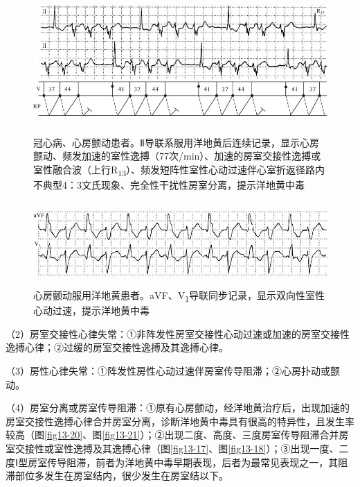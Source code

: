 \begin{figure}[!htbp]
 \centering
 \includegraphics[width=5.71875in,height=2.15625in]{./images/Image00736.jpg}
 \captionsetup{justification=centering}
 \caption{冠心病、心房颤动患者。Ⅱ导联系服用洋地黄后连续记录，显示心房颤动、频发加速的室性逸搏（77次/min）、加速的房室交接性逸搏或室性融合波（上行R\textsubscript{13}）、频发短阵性室性心动过速伴心室折返径路内不典型4：3文氏现象、完全性干扰性房室分离，提示洋地黄中毒}
 \label{fig46-1}
  \end{figure} 


\begin{figure}[!htbp]
 \centering
 \includegraphics[width=5.6875in,height=1.26042in]{./images/Image00737.jpg}
 \captionsetup{justification=centering}
 \caption{心房颤动服用洋地黄患者。aVF、V\textsubscript{1}导联同步记录，显示双向性室性心动过速，提示洋地黄中毒}
 \label{fig46-2}
  \end{figure} 


（2）房室交接性心律失常：①非阵发性房室交接性心动过速或加速的房室交接性逸搏心律；②过缓的房室交接性逸搏及其逸搏心律。

（3）房性心律失常：①阵发性房性心动过速伴房室传导阻滞；②心房扑动或颤动。

（4）房室分离或房室传导阻滞：①原有心房颤动，经洋地黄治疗后，出现加速的房室交接性逸搏心律合并房室分离，诊断洋地黄中毒具有很高的特异性，且发生率较高（图\ref{fig13-20}、图\ref{fig13-21}）；②出现二度、高度、三度房室传导阻滞合并房室交接性或室性逸搏及其逸搏心律（图\ref{fig13-17}、图\ref{fig13-18}）；③出现一度、二度Ⅰ型房室传导阻滞，前者为洋地黄中毒早期表现，后者为最常见表现之一，其阻滞部位多发生在房室结内，很少发生在房室结以下。

